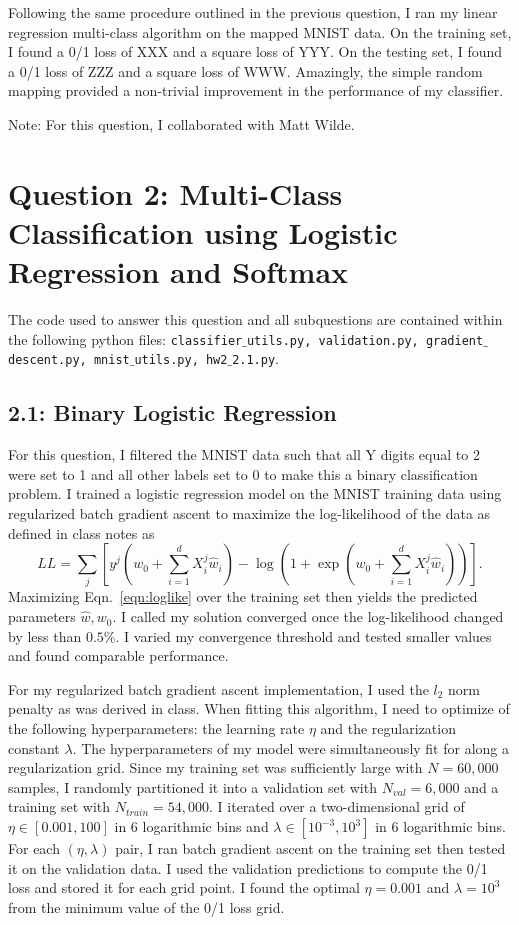 \documentclass[12pt]{amsart}
\begin{document}
Following the same procedure outlined in the previous question, I ran my linear regression multi-class algorithm on the mapped MNIST data.  On the training set, I found a 0/1 loss of XXX and a square loss of YYY.  On the testing set, I found a 0/1 loss of ZZZ and a square loss of WWW.  Amazingly, the simple random mapping provided a non-trivial improvement in the performance of my classifier.

Note: For this question, I collaborated with Matt Wilde.

\section*{Question 2: Multi-Class Classification using Logistic Regression and Softmax}

The code used to answer this question and all subquestions are contained within the following python files: {\tt classifier$\_$utils.py, validation.py, gradient$\_$descent.py, mnist$\_$utils.py, hw2$\_$2.1.py}.

\subsection*{2.1: Binary Logistic Regression}

For this question, I filtered the MNIST data such that all Y digits equal to 2 were set to 1 and all other labels set to 0 to make this a binary classification problem.  I trained a logistic regression model on the MNIST training data using regularized batch gradient ascent to maximize the log-likelihood of the data as defined in class notes as
\begin{equation} \label{eqn:loglike}
LL = \sum_j [y^j (w_0 + \sum_{i=1}^d X_i^j \hat{w}_i) - \log(1+ \exp(w_0 + \sum_{i=1}^d X_i^j \hat{w}_i))].
\end{equation}
Maximizing Eqn.~\ref{eqn:loglike} over the training set then yields the predicted parameters $\hat{w}, w_0$.  I called my solution converged once the log-likelihood changed by less than $0.5 \%$.  I varied my convergence threshold and tested smaller values and found comparable performance.

For my regularized batch gradient ascent implementation, I used the $l_2$ norm penalty as was derived in class.  When fitting this algorithm, I need to optimize of the following hyperparameters: the learning rate $\eta$ and the regularization constant $\lambda$.  The hyperparameters of my model were simultaneously fit for along a regularization grid.  Since my training set was sufficiently large with $N = 60,000$ samples, I randomly partitioned it into a validation set with $N_{val} = 6,000$ and a training set with $N_{train} = 54,000$.  I iterated over a two-dimensional grid of $\eta \in [0.001,100]$ in 6 logarithmic bins and $\lambda \in [10^{-3},10^{3}]$ in 6 logarithmic bins.  For each $(\eta,\lambda)$ pair, I ran batch gradient ascent on the training set then tested it on the validation data.  I used the validation predictions to compute the 0/1 loss and stored it for each grid point.  I found the optimal $\eta = 0.001$ and $\lambda = 10^3$ from the minimum value of the 0/1 loss grid.  
\end{document}
